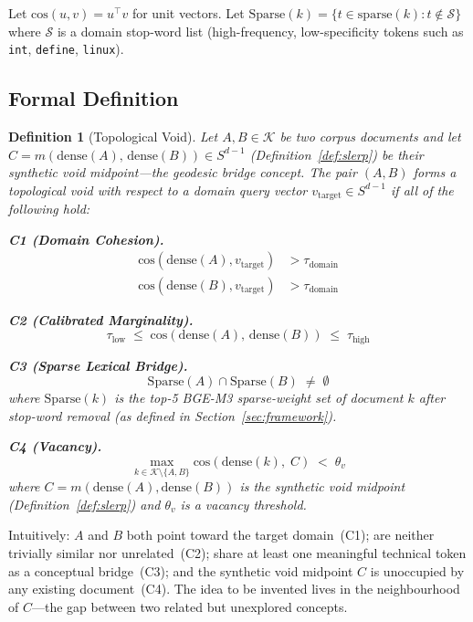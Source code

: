 \documentclass[11pt,twocolumn]{article}
\newtheorem{definition}{Definition}
\newcommand{\vtarget}{v_{\mathrm{target}}}
\newcommand{\taudomain}{\tau_{\mathrm{domain}}}
\newcommand{\taulow}{\tau_{\mathrm{low}}}
\newcommand{\tauhigh}{\tau_{\mathrm{high}}}
\begin{document}
Let $\mathrm{cos}(u,v) = u^\top v$ for unit vectors.  Let
$\mathrm{Sparse}(k) = \{t \in \mathrm{sparse}(k) : t \notin
\mathcal{S}\}$ where $\mathcal{S}$ is a domain stop-word list
(high-frequency, low-specificity tokens such as \texttt{int},
\texttt{define}, \texttt{linux}).

\subsection{Formal Definition}

\begin{definition}[Topological Void]
\label{def:void}
Let $A, B \in \mathcal{K}$ be two corpus documents and let
$C = m(\mathrm{dense}(A),\,\mathrm{dense}(B)) \in S^{d-1}$
(Definition~\ref{def:slerp}) be their synthetic
\emph{void midpoint}---the geodesic bridge concept.
The pair $(A, B)$ forms a \emph{topological void}
with respect to a domain query vector $\vtarget \in S^{d-1}$ if
all of the following hold:

\medskip
\noindent\textbf{C1 (Domain Cohesion).}
\begin{align*}
  \mathrm{cos}(\mathrm{dense}(A), \vtarget) &> \taudomain \\
  \mathrm{cos}(\mathrm{dense}(B), \vtarget) &> \taudomain
\end{align*}

\noindent\textbf{C2 (Calibrated Marginality).}
\[
  \taulow \;\le\;
  \mathrm{cos}(\mathrm{dense}(A),\,\mathrm{dense}(B))
  \;\le\; \tauhigh
\]

\noindent\textbf{C3 (Sparse Lexical Bridge).}
\[
  \mathrm{Sparse}(A) \cap \mathrm{Sparse}(B) \;\ne\; \emptyset
\]
where $\mathrm{Sparse}(k)$ is the top-5 BGE-M3 sparse-weight set
of document $k$ after stop-word removal (as defined in
Section~\ref{sec:framework}).

\noindent\textbf{C4 (Vacancy).}
\[
  \max_{k \in \mathcal{K} \setminus \{A,B\}}
    \mathrm{cos}(\mathrm{dense}(k),\; C)
  \;<\; \theta_v
\]
where $C = m(\mathrm{dense}(A), \mathrm{dense}(B))$ is the synthetic
void midpoint (Definition~\ref{def:slerp}) and $\theta_v$ is a
vacancy threshold.
\end{definition}

Intuitively: $A$ and $B$ both point toward the target domain~(C1);
are neither trivially similar nor unrelated~(C2); share at least one
meaningful technical token as a conceptual bridge~(C3); and the
synthetic void midpoint $C$ is unoccupied by any existing
document~(C4).  The idea to be invented lives in the neighbourhood
of $C$---the gap between two related but unexplored concepts.
\end{document}
